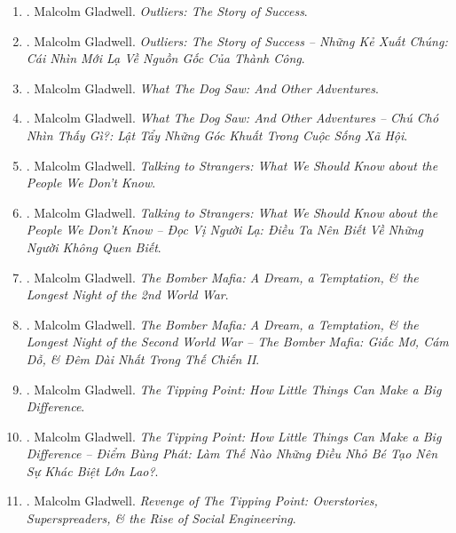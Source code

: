 \documentclass{article}
\begin{document}
\begin{enumerate}
	\item \cite{Gladwell_outlier}. {\sc Malcolm Gladwell}. {\it Outliers: The Story of Success}.\hfill{\sf[reading]}

	\item \cite{Gladwell_outlier_VN}. {\sc Malcolm Gladwell}. {\it Outliers: The Story of Success -- Những Kẻ Xuất Chúng: Cái Nhìn Mới Lạ Về Nguồn Gốc Của Thành Công}.\hfill{\sf[done]}

	\item \cite{Gladwell_dog}. {\sc Malcolm Gladwell}. {\it What The Dog Saw: And Other Adventures}.\hfill{\sf[reading]}

	\item \cite{Gladwell_dog_VN}. {\sc Malcolm Gladwell}. {\it What The Dog Saw: And Other Adventures -- Chú Chó Nhìn Thấy Gì?: Lật Tẩy Những Góc Khuất Trong Cuộc Sống Xã Hội}.\hfill{\sf[done]}

	\item \cite{Gladwell_stranger}. {\sc Malcolm Gladwell}. {\it Talking to Strangers: What We Should Know about the People We Don't Know}.\hfill{\sf[reading]}

	\item \cite{Gladwell_stranger_VN}. {\sc Malcolm Gladwell}. {\it Talking to Strangers: What We Should Know about the People We Don't Know -- Đọc Vị Người Lạ: Điều Ta Nên Biết Về Những Người Không Quen Biết}.\hfill{\sf[done]}

	\item \cite{Gladwell_bomber_mafia}. {\sc Malcolm Gladwell}. {\it The Bomber Mafia: A Dream, a Temptation, \& the Longest Night of the 2nd World War}.\hfill{\sf[reading]}

	\item \cite{Gladwell_bomber_mafia_VN}. {\sc Malcolm Gladwell}. {\it The Bomber Mafia: A Dream, a Temptation, \& the Longest Night of the Second World War -- The Bomber Mafia: Giấc Mơ, Cám Dỗ, \& Đêm Dài Nhất Trong Thế Chiến II}.\hfill{\sf[done]}

	\item \cite{Gladwell_tipping_point}. {\sc Malcolm Gladwell}. {\it The Tipping Point: How Little Things Can Make a Big Difference}.\hfill{\sf[reading]}

	\item \cite{Gladwell_tipping_point_VN}. {\sc Malcolm Gladwell}. {\it The Tipping Point: How Little Things Can Make a Big Difference -- Điểm Bùng Phát: Làm Thế Nào Những Điều Nhỏ Bé Tạo Nên Sự Khác Biệt Lớn Lao?}.\hfill{\sf[done]}

	\item \cite{Gladwell_revenge_tipping_point}. {\sc Malcolm Gladwell}. {\it Revenge of The Tipping Point: Overstories, Superspreaders, \& the Rise of Social Engineering}. {}\hfill{\sf[reading]}


\end{enumerate}
\end{document}
